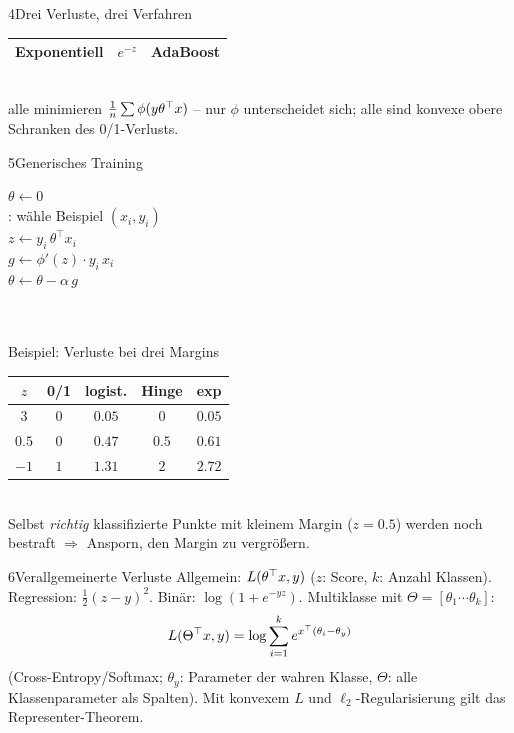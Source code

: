 \begin{hngrid}
\begin{hnp}[raster multicolumn=3,acc=hnnavy]{4}{Drei Verluste, drei Verfahren}
\begin{tabular}{@{}p{2.0cm}p{2.8cm}p{3.6cm}@{}}
Exponentiell&$e^{-z}$&AdaBoost\\\hline
\end{tabular}
\\[3pt]
 alle minimieren $\frac1n\sum\phi(y\theta^{\top} x)$ -- nur $\phi$ unterscheidet sich; alle sind konvexe obere Schranken des 0/1-Verlusts.
\end{hnp}
%
\begin{hnp}[raster multicolumn=3,acc=hngreen]{5}{Generisches Training}
\begin{pcode}
 $\theta\leftarrow0$\\
: wähle Beispiel $(x_i,y_i)$\\
\hii $z\leftarrow y_i\,\theta^{\top}x_i$\\
\hii $g\leftarrow\phi'(z)\cdot y_i\,x_i$\\
\hii $\theta\leftarrow\theta-\alpha\,g$\\
\\
\\
\end{pcode}
\end{hnp}
%
\begin{hnex}[raster multicolumn=3]{Beispiel: Verluste bei drei Margins}
\renewcommand{\arraystretch}{1.25}
\begin{tabular}{@{}c|cccc@{}}
$z$&0/1&logist.&Hinge&exp\\\hline
$3$&$0$&$0.05$&$0$&$0.05$\\
$0.5$&$0$&$0.47$&$0.5$&$0.61$\\
$-1$&$1$&$1.31$&$2$&$2.72$\\
\end{tabular}\\[2pt]
Selbst \emph{richtig} klassifizierte Punkte mit kleinem Margin ($z=0.5$) werden noch bestraft $\Rightarrow$ Ansporn, den Margin zu vergrößern.
\end{hnex}
%
\begin{hnp}[raster multicolumn=3,acc=hnrose]{6}{Verallgemeinerte Verluste}
Allgemein: $L(\theta^{\top} x,y)$ ($z$: Score, $k$: Anzahl Klassen). Regression: $\frac12(z-y)^2$. Binär: $\log(1+e^{-yz})$. Multiklasse mit $\Theta=[\theta_1\cdots\theta_k]$:
\[ L(\Theta^{\top} x,y)=\log\sum_{i=1}^{k}e^{x^{\top}(\theta_i-\theta_y)} \]
(Cross-Entropy/Softmax; $\theta_y$: Parameter der wahren Klasse, $\Theta$: alle Klassenparameter als Spalten). Mit konvexem $L$ und $\ell_2$-Regularisierung gilt das Representer-Theorem.

\end{hnp}
\end{hngrid}

